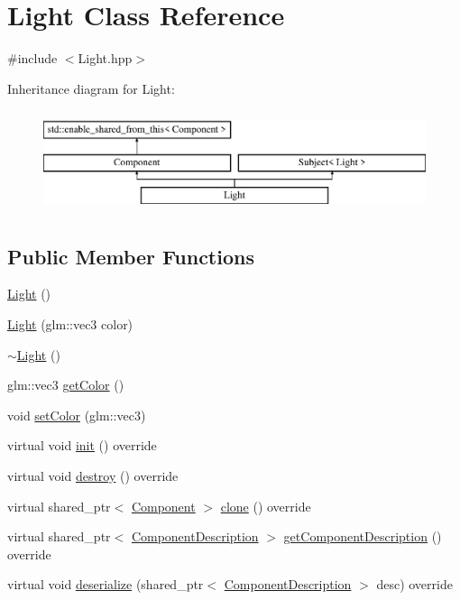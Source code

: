 \hypertarget{class_light}{}\section{Light Class Reference}
\label{class_light}


{\ttfamily \#include $<$Light.\+hpp$>$}

Inheritance diagram for Light\+:\begin{figure}[H]
\begin{center}
\leavevmode
\includegraphics[height=3.000000cm]{class_light}
\end{center}
\end{figure}
\subsection*{Public Member Functions}
\begin{DoxyCompactItemize}
\item 
\hyperlink{class_light_aeb5df09a25a32f19fdffa761268ba24f}{Light} ()
\item 
\hyperlink{class_light_aed70489514bbca33c1c47be11ee5d016}{Light} (glm\+::vec3 color)
\item 
\hyperlink{class_light_ad0e59fad13bb6cfadc25b2c477e9ddc7}{$\sim$\+Light} ()
\item 
glm\+::vec3 \hyperlink{class_light_afcf6054826dc365ca58126c582b71b7a}{get\+Color} ()
\item 
void \hyperlink{class_light_a6dcff3d6e3d90d6d34f5a08e60567f31}{set\+Color} (glm\+::vec3)
\item 
virtual void \hyperlink{class_light_a2c59296fb881070f1e7064ec3ccd4d3d}{init} () override
\item 
virtual void \hyperlink{class_light_a5068d4a5fa02cd63a693030dc4a359fe}{destroy} () override
\item 
virtual shared\+\_\+ptr$<$ \hyperlink{class_component}{Component} $>$ \hyperlink{class_light_ae8747116c592100394c89f76035725e5}{clone} () override
\item 
virtual shared\+\_\+ptr$<$ \hyperlink{class_component_description}{Component\+Description} $>$ \hyperlink{group__serialization__functions_gab8f75c87a12c9eed1fbb3534b516799c}{get\+Component\+Description} () override
\item 
virtual void \hyperlink{group__serialization__functions_ga15349b8cfad97f209ae6ceb0d329bc34}{deserialize} (shared\+\_\+ptr$<$ \hyperlink{class_component_description}{Component\+Description} $>$ desc) override
\end{DoxyCompactItemize}
